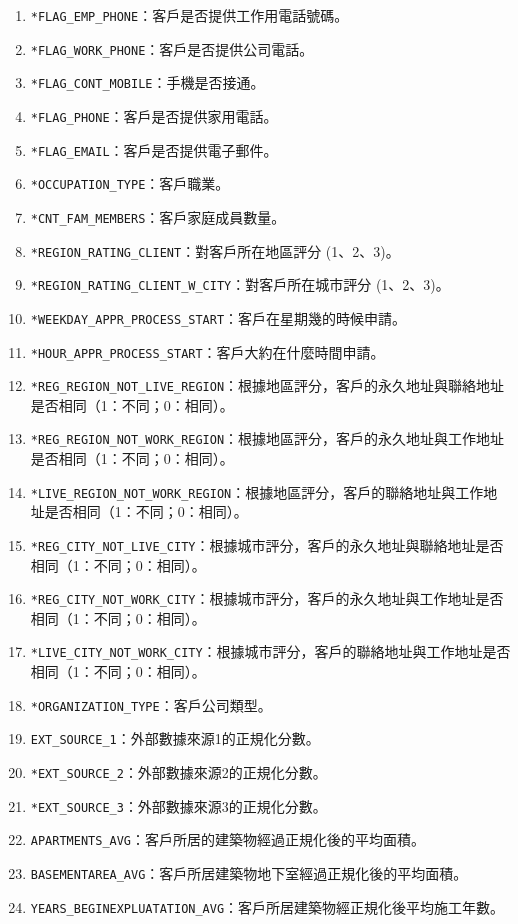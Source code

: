 \documentclass[12pt, a4paper]{article}
\begin{document}
\begin{enumerate}
\item \verb|*FLAG_EMP_PHONE|：客戶是否提供工作用電話號碼。
\item \verb|*FLAG_WORK_PHONE|：客戶是否提供公司電話。
\item \verb|*FLAG_CONT_MOBILE|：手機是否接通。
\item \verb|*FLAG_PHONE|：客戶是否提供家用電話。
\item \verb|*FLAG_EMAIL|：客戶是否提供電子郵件。
\item \verb|*OCCUPATION_TYPE|：客戶職業。
\item \verb|*CNT_FAM_MEMBERS|：客戶家庭成員數量。
\item \verb|*REGION_RATING_CLIENT|：對客戶所在地區評分 (1、2、3)。
\item \verb|*REGION_RATING_CLIENT_W_CITY|：對客戶所在城市評分 (1、2、3)。
\item \verb|*WEEKDAY_APPR_PROCESS_START|：客戶在星期幾的時候申請。
\item \verb|*HOUR_APPR_PROCESS_START|：客戶大約在什麼時間申請。
\item \verb|*REG_REGION_NOT_LIVE_REGION|：根據地區評分，客戶的永久地址與聯絡地址是否相同（1：不同；0：相同）。
\item \verb|*REG_REGION_NOT_WORK_REGION|：根據地區評分，客戶的永久地址與工作地址是否相同（1：不同；0：相同）。
\item \verb|*LIVE_REGION_NOT_WORK_REGION|：根據地區評分，客戶的聯絡地址與工作地址是否相同（1：不同；0：相同）。
\item \verb|*REG_CITY_NOT_LIVE_CITY|：根據城市評分，客戶的永久地址與聯絡地址是否相同（1：不同；0：相同）。
\item \verb|*REG_CITY_NOT_WORK_CITY|：根據城市評分，客戶的永久地址與工作地址是否相同（1：不同；0：相同）。
\item \verb|*LIVE_CITY_NOT_WORK_CITY|：根據城市評分，客戶的聯絡地址與工作地址是否相同（1：不同；0：相同）。
\item \verb|*ORGANIZATION_TYPE|：客戶公司類型。
\item \verb|EXT_SOURCE_1|：外部數據來源1的正規化分數。
\item \verb|*EXT_SOURCE_2|：外部數據來源2的正規化分數。
\item \verb|*EXT_SOURCE_3|：外部數據來源3的正規化分數。
\item \verb|APARTMENTS_AVG|：客戶所居的建築物經過正規化後的平均面積。
\item \verb|BASEMENTAREA_AVG|：客戶所居建築物地下室經過正規化後的平均面積。
\item \verb|YEARS_BEGINEXPLUATATION_AVG|：客戶所居建築物經正規化後平均施工年數。

\end{enumerate}
\end{document}
